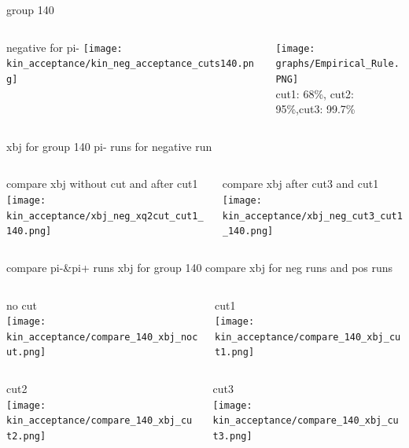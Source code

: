 \documentclass[aspectratio=169,xcolor=dvipsnames]{beamer}
\begin{document}
\begin{frame}{group 140}
  \begin{columns}
    \begin{column}[T]{0.5\textwidth}
      negative for pi-
      \texttt{[image: kin\_acceptance/kin\_neg\_acceptance\_cuts140.png]}
    \end{column}
    \begin{column}[T]{0.5\textwidth}
       \texttt{[image: graphs/Empirical\_Rule.PNG]}
       \\
       cut1: 68\%, cut2: 95\%,cut3: 99.7\% 
    \end{column}
  \end{columns}

\end{frame}

\begin{frame}{xbj for group 140 pi- runs}
  for negative run 
  \begin{columns}
    \begin{column}[T]{0.5\textwidth}
      compare xbj without cut and after cut1
      \texttt{[image: kin\_acceptance/xbj\_neg\_xq2cut\_cut1\_140.png]}
\end{column}
\begin{column}[T]{0.5\textwidth}
  compare xbj after cut3 and cut1
  \texttt{[image: kin\_acceptance/xbj\_neg\_cut3\_cut1\_140.png]}
\end{column}
\end{columns}
\end{frame}

\begin{frame}{compare pi-&pi+ runs xbj for group 140}
      compare xbj for neg runs and pos runs
  \begin{columns}
    \begin{column}[T]{0.5\textwidth}
      no cut\\
      \texttt{[image: kin\_acceptance/compare\_140\_xbj\_nocut.png]}
\end{column}
\begin{column}[T]{0.5\textwidth}
cut1\\
  \texttt{[image: kin\_acceptance/compare\_140\_xbj\_cut1.png]}
\end{column}
\end{columns}
  \begin{columns}
    \begin{column}[T]{0.5\textwidth}
       cut2\\
  \texttt{[image: kin\_acceptance/compare\_140\_xbj\_cut2.png]}
\end{column}
\begin{column}[T]{0.5\textwidth}
       cut3\\
  \texttt{[image: kin\_acceptance/compare\_140\_xbj\_cut3.png]}
\end{column}
\end{columns}
\end{frame}
\end{document}
